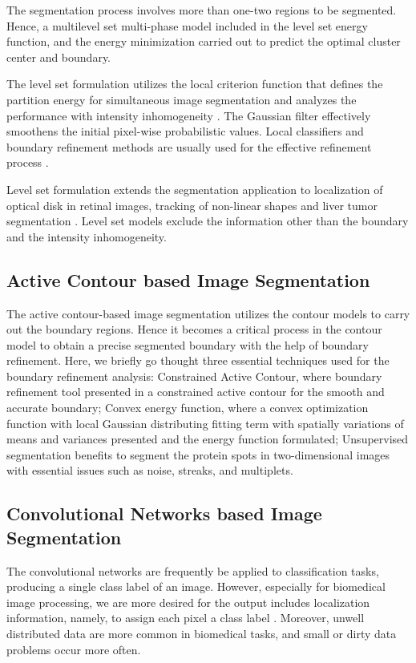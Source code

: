 The segmentation process involves more than one-two regions to be segmented. Hence, a multilevel set multi-phase model \cite{li18} included in the level set energy function, and the energy minimization carried out to predict the optimal cluster center and boundary.

The level set formulation utilizes the local criterion function that defines the partition energy for simultaneous image segmentation and analyzes the performance with intensity inhomogeneity \cite{unified}. The Gaussian filter effectively smoothens the initial pixel-wise probabilistic values. Local classifiers and boundary refinement methods are usually used for the effective refinement process \cite{taneja}.

Level set formulation extends the segmentation application to localization of optical disk in retinal images, tracking of non-linear shapes and liver tumor segmentation \cite{taneja} \cite{unified}\cite{li18}. Level set models exclude the information other than the boundary and the intensity inhomogeneity.

\subsection{ Active Contour based Image Segmentation }

The active contour-based image segmentation \cite{unsupervised} utilizes the contour models to carry out the boundary regions. Hence it becomes a critical process in the contour model to obtain a precise segmented boundary with the help of boundary refinement. Here, we briefly go thought three essential techniques used for the boundary refinement analysis: Constrained Active  Contour\cite{constrained}, where boundary refinement tool presented in a constrained active contour for the smooth and accurate boundary; Convex energy function\cite{convex}, where a convex optimization function with local Gaussian distributing fitting term with spatially variations of means and variances presented and the energy function formulated; Unsupervised segmentation \cite{unsupervised}  benefits to segment the protein spots in two-dimensional images with essential issues such as noise, streaks, and multiplets.


\subsection{ Convolutional Networks based Image Segmentation }

The convolutional networks are frequently be applied to classification tasks, producing a single class label of an image. However, especially for biomedical image processing, we are more desired for the output includes localization information,  namely, to assign each pixel a class label \cite{unet}. Moreover, unwell distributed data are more common in biomedical tasks, and small or dirty data problems occur more often. 

